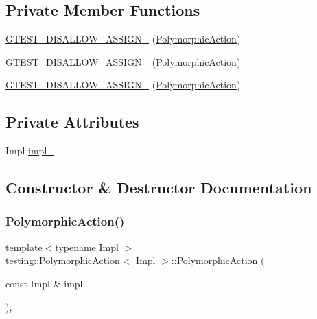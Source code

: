 \subsection*{Private Member Functions}
\begin{DoxyCompactItemize}
\item 
\mbox{\hyperlink{classtesting_1_1_polymorphic_action_a12db33e1d2f389637961994c851c97b6}{G\+T\+E\+S\+T\+\_\+\+D\+I\+S\+A\+L\+L\+O\+W\+\_\+\+A\+S\+S\+I\+G\+N\+\_\+}} (\mbox{\hyperlink{classtesting_1_1_polymorphic_action}{Polymorphic\+Action}})
\item 
\mbox{\hyperlink{classtesting_1_1_polymorphic_action_a12db33e1d2f389637961994c851c97b6}{G\+T\+E\+S\+T\+\_\+\+D\+I\+S\+A\+L\+L\+O\+W\+\_\+\+A\+S\+S\+I\+G\+N\+\_\+}} (\mbox{\hyperlink{classtesting_1_1_polymorphic_action}{Polymorphic\+Action}})
\item 
\mbox{\hyperlink{classtesting_1_1_polymorphic_action_a12db33e1d2f389637961994c851c97b6}{G\+T\+E\+S\+T\+\_\+\+D\+I\+S\+A\+L\+L\+O\+W\+\_\+\+A\+S\+S\+I\+G\+N\+\_\+}} (\mbox{\hyperlink{classtesting_1_1_polymorphic_action}{Polymorphic\+Action}})
\end{DoxyCompactItemize}
\subsection*{Private Attributes}
\begin{DoxyCompactItemize}
\item 
Impl \mbox{\hyperlink{classtesting_1_1_polymorphic_action_ac072ea4c539fd1c6be75798fe9d801f4}{impl\+\_\+}}
\end{DoxyCompactItemize}


\subsection{Constructor \& Destructor Documentation}
\mbox{\label{classtesting_1_1_polymorphic_action_a062e5a45ad61dcf8085b15cc882ca0ae}} 
\subsubsection{\texorpdfstring{PolymorphicAction()}{PolymorphicAction()}\hspace{0.1cm}{\footnotesize\ttfamily [1/3]}}
{\footnotesize\ttfamily template$<$typename Impl $>$ \\
\mbox{\hyperlink{classtesting_1_1_polymorphic_action}{testing\+::\+Polymorphic\+Action}}$<$ Impl $>$\+::\mbox{\hyperlink{classtesting_1_1_polymorphic_action}{Polymorphic\+Action}} (\begin{DoxyParamCaption}\item[{const Impl \&}]{impl }\end{DoxyParamCaption})\hspace{0.3cm}{\ttfamily [inline]}, {\ttfamily [explicit]}}

